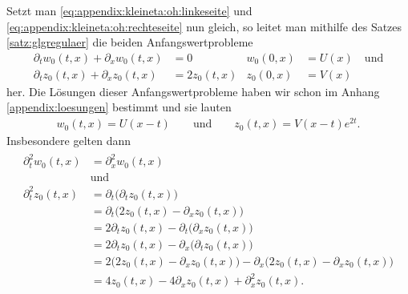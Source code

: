 Setzt man \eqref{eq:appendix:kleineta:oh:linkeseite} und \eqref{eq:appendix:kleineta:oh:rechteseite} nun gleich, so leitet man mithilfe des Satzes \ref{satz:glgregulaer} die beiden Anfangswertprobleme
\begin{align}\label{eq:appendix:kleineta:oh}
\partial_t w_0(t,x) + \partial_x w_0(t,x) &= 0 &w_0(0,x) &= U(x) \quad \text{und}\\
\partial_t z_0(t,x) + \partial_x z_0(t,x) &= 2 z_0(t,x)  &z_0(0,x) &= V(x) 
\end{align}
her. Die Lösungen dieser Anfangswertprobleme haben wir schon im Anhang \ref{appendix:loesungen} bestimmt und sie lauten
\begin{align}
w_0(t,x) = U(x - t) \qquad \text{und} \qquad z_0(t,x) = V(x - t) e^{2 t}.
\end{align}
Insbesondere gelten dann
\begin{align}\label{eq:appendix:kleineta:korollar:h2}
\begin{split}
\partial^2_t w_0(t,x) &= \partial^2_x w_0(t,x)\qquad\\&\text{und}\\
\partial^2_t z_0(t,x) &= \partial_t \bigl( \partial_t z_0(t,x) \bigr)\\
&= \partial_t \bigl( 2z_0(t,x)  - \partial_x z_0(t,x) \bigr)\\
&= 2 \partial_t z_0(t,x) - \partial_t \bigl( \partial_x z_0(t,x) \bigr)\\
&= 2 \partial_t z_0(t,x) - \partial_x \bigl( \partial_t z_0(t,x) \bigr)\\
&= 2 \bigl( 2z_0(t,x) - \partial_x z_0(t,x) \bigr) - \partial_x \bigl( 2 z_0(t,x) - \partial_x z_0(t,x) \bigr)\\
&= 4 z_0(t,x) - 4 \partial_x z_0(t,x) + \partial^2_x z_0(t,x).
\end{split}
\end{align}

